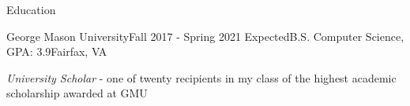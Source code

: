 \documentclass{resume} %
\begin{document}

\begin{rSection}{Education}
\begin{rSubsection}{George Mason University}{Fall 2017 - Spring 2021 Expected}{B.S. Computer Science, GPA: 3.9}{Fairfax, VA}

  \item \emph{University Scholar} - one of twenty recipients in my class of the highest academic scholarship awarded at GMU

\end{rSubsection}
\end{rSection}

\end{document}
